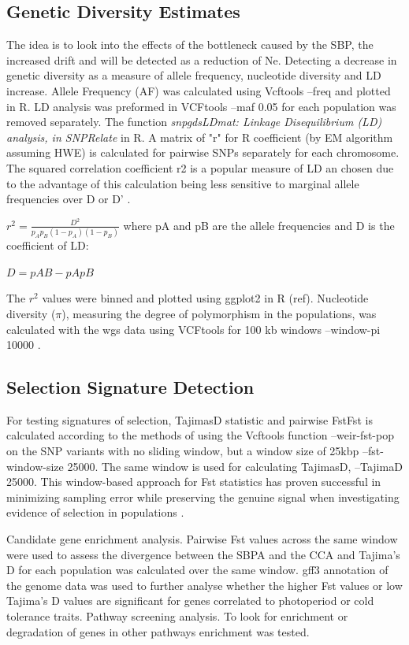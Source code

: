 \documentclass[9pt, twocolumn,twoside]{gsajnl}
\begin{document}
\subsection{Genetic Diversity Estimates}
The idea is to look into the effects of the bottleneck caused by the SBP, the increased drift and will be detected as a reduction of Ne. Detecting a decrease in genetic diversity as a measure of allele frequency, nucleotide diversity and LD increase. Allele Frequency (AF) was calculated using Vcftools --freq and plotted in R. LD analysis was preformed in VCFtools  --maf 0.05 for each population was removed separately. The function \textit{snpgdsLDmat: Linkage Disequilibrium (LD) analysis, in SNPRelate }in R. A matrix of "r" for R coefficient (by EM algorithm assuming HWE) is calculated for pairwise SNPs separately for each chromosome. 
The squared correlation coefficient r2 is a popular measure of LD an chosen due to the advantage of this calculation being less sensitive to marginal allele frequencies over  D or D' \cite{sved18}. 

\(r^2 = \frac{D^2}{p_Ap_B(1 - p_A)(1 - p_B)}\) where pA and pB are the allele frequencies and D is the coefficient of LD: 


$D=pAB−pApB$


The $r^2$  values were binned and plotted using ggplot2 \cite{wickham16} in R (ref).  Nucleotide diversity ($\pi$), measuring the degree of polymorphism in the populations, was calculated with the wgs data using VCFtools for 100 kb windows --window-pi 10000 \cite{nei79}. 

\subsection{Selection Signature Detection }
For testing signatures of selection, TajimasD statistic and pairwise FstFst is calculated according to the methods of \cite{Weir84} using the Vcftools function --weir-fst-pop on the SNP variants with no sliding window, but a window size of 25kbp --fst-window-size 25000. The same window is used for calculating TajimasD, --TajimaD 25000. This window-based approach for Fst statistics has proven successful in minimizing sampling error while preserving the genuine signal when investigating evidence of selection in populations \cite{beissinger15}.

Candidate gene enrichment analysis. 
Pairwise Fst values across the same window were used to assess the divergence between the SBPA and the CCA and Tajima's D for each population was calculated over the same window. 
gff3 annotation of the genome data was used to further analyse whether the higher Fst values or low Tajima's D values are significant for genes correlated to photoperiod or cold tolerance traits. 
Pathway screening analysis.
To look for enrichment or degradation of genes in other pathways enrichment was tested.  
\end{document}
